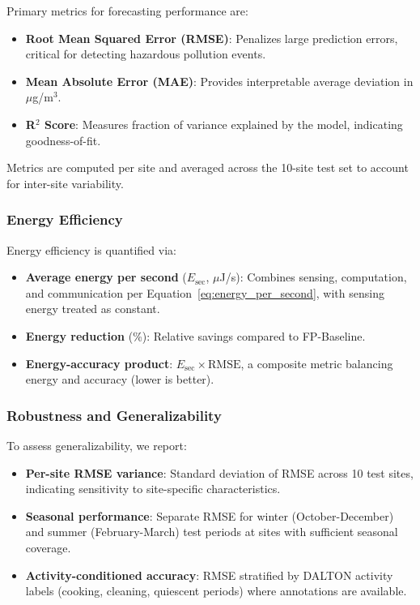 Primary metrics for forecasting performance are:
\begin{itemize}
\item \textbf{Root Mean Squared Error (RMSE)}: Penalizes large prediction errors, critical for detecting hazardous pollution events.
\item \textbf{Mean Absolute Error (MAE)}: Provides interpretable average deviation in $\mu$g/m$^3$.
\item \textbf{R$^2$ Score}: Measures fraction of variance explained by the model, indicating goodness-of-fit.
\end{itemize}

Metrics are computed per site and averaged across the 10-site test set to account for inter-site variability.

\subsubsection{Energy Efficiency}

Energy efficiency is quantified via:
\begin{itemize}
\item \textbf{Average energy per second} ($E_{\text{sec}}$, $\mu$J/s): Combines sensing, computation, and communication per Equation~\eqref{eq:energy_per_second}, with sensing energy treated as constant.
\item \textbf{Energy reduction} (\%): Relative savings compared to FP-Baseline.
\item \textbf{Energy-accuracy product}: $E_{\text{sec}} \times \text{RMSE}$, a composite metric balancing energy and accuracy (lower is better).
\end{itemize}

\subsubsection{Robustness and Generalizability}

To assess generalizability, we report:
\begin{itemize}
\item \textbf{Per-site RMSE variance}: Standard deviation of RMSE across 10 test sites, indicating sensitivity to site-specific characteristics.
\item \textbf{Seasonal performance}: Separate RMSE for winter (October-December) and summer (February-March) test periods at sites with sufficient seasonal coverage.
\item \textbf{Activity-conditioned accuracy}: RMSE stratified by DALTON activity labels (cooking, cleaning, quiescent periods) where annotations are available.
\end{itemize}

